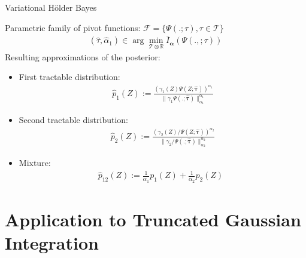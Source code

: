 \documentclass{beamer}
\newcommand{\Holder}{H\"older\xspace}
\newcommand{\tauspace}{\mathcal{T}}
\def\btau{{\bm{\tau}}}
\newcommand{\balpha}{{\bm{\alpha}}}
\def\proba{p}
\renewcommand{\Re}{\mathbb{R}}
\begin{document}
\begin{frame}{Variational \Holder  Bayes}

	Parametric family of pivot functions: $\mathcal{F}=\{\Psi(.;\tau),\tau\in\tauspace\}$
	\begin{align}
	  (\hat\tau,\hat\alpha_1) \in \arg\min_{\tauspace\otimes\Re} \bar I_\balpha(\Psi(.,;\tau))
	\end{align}
	Resulting approximations of the posterior: 
	\begin{itemize}
	\item First tractable distribution:	
	\begin{eqnarray}
	\hat\proba_1(Z) := \frac{(\gamma_1(Z)\Psi(Z;\hat\btau))^{\alpha_1}}{\|\gamma_1\Psi(.;\hat\btau)\|^{\alpha_1}_{\alpha_1}}
	\end{eqnarray}
	\item Second tractable distribution:
	\begin{eqnarray}
	\hat\proba_2(Z) := \frac{(\gamma_2(Z)/\Psi(Z;\hat\btau))^{\alpha_2}}{\|\gamma_2/\Psi(.;\hat\btau)\|^{\alpha_2}_{\alpha_2}}
	\end{eqnarray}
	\item Mixture:
	\begin{eqnarray}
\hat\proba_{12}(Z) := \frac {1}{\alpha_1}\proba_1(Z) + \frac {1}{\alpha_2}\proba_2(Z)
\enspace
\end{eqnarray}	
	\end{itemize}
\end{frame}



\section{Application to Truncated Gaussian Integration}
\end{document}
